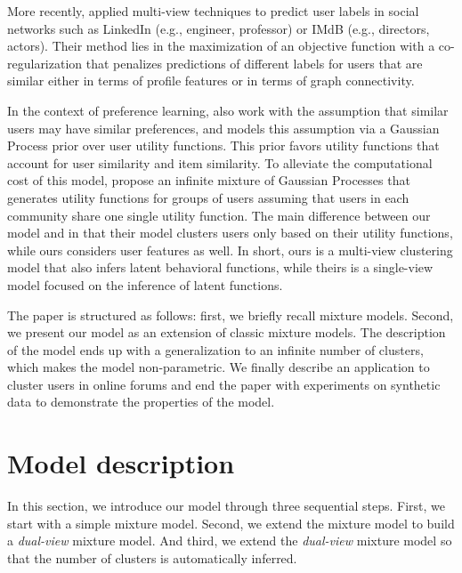 \documentclass[smallextended]{svjour3}          %
\begin{document}
More recently, \cite{Cheng2014} applied multi-view techniques to predict user labels in social networks such as LinkedIn (e.g., engineer, professor) or IMdB (e.g., directors, actors). Their method lies in the maximization of an objective function with a co-regularization that penalizes predictions of different labels for users that are similar either in terms of profile features or in terms of graph connectivity.

In the context of preference learning, \cite{Bonilla2010} also work with the assumption that similar users may have similar preferences, and models this assumption via a Gaussian Process prior over user utility functions. This prior favors utility functions that account for user similarity and item similarity. To alleviate the computational cost of this model, \cite{Abbasnejad2013a} propose an infinite mixture of Gaussian Processes that generates utility functions for groups of users assuming that users in each community share one single utility function. 
%
The main difference between our model and \cite{Abbasnejad2013a} in that their model clusters users only based on their utility functions, while ours considers user features as well. In short, ours is a multi-view clustering model that also infers latent behavioral functions, while theirs is a single-view model focused on the inference of latent functions.

The paper is structured as follows: first, we briefly recall mixture models. Second, we present our model as an extension of classic mixture models. The description of the model ends up with a generalization to an infinite number of clusters, which makes the model non-parametric. We finally describe an application to cluster users in online forums and end the paper with experiments on synthetic data to demonstrate the properties of the model.

\section{Model description}\label{sec:modeldescription}
In this section, we introduce our model through three sequential steps. First, we start with a simple mixture model. Second, we extend the mixture model to build a \textit{dual-view} mixture model. And third, we extend the \textit{dual-view} mixture model so that the number of clusters is automatically inferred.
\end{document}
